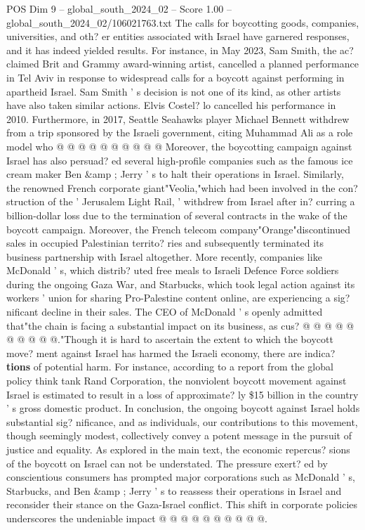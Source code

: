 \begin{textsample}{POS Dim 9 – global\_south\_2024\_02 – Score 1.00 – global\_south\_2024\_02/106021763.txt}
The calls for boycotting goods, companies, universities, and oth? er entities associated with Israel have garnered responses, and it has indeed yielded results.
For instance, in May 2023, Sam Smith, the ac? claimed Brit and Grammy award-winning artist, cancelled a planned performance in Tel Aviv in response to widespread calls for a boycott against performing in apartheid Israel.
Sam Smith ' s decision is not one of its kind, as other artists have also taken similar actions.
Elvis Costel? lo cancelled his performance in 2010.
Furthermore, in 2017, Seattle Seahawks player Michael Bennett withdrew from a trip sponsored by the Israeli government, citing Muhammad Ali as a role model who @ @ @ @ @ @ @ @ @ @ Moreover, the boycotting campaign against Israel has also persuad? ed several high-profile companies such as the famous ice cream maker Ben \&amp ; Jerry ' s to halt their operations in Israel.
Similarly, the renowned French corporate giant"Veolia,"which had been involved in the con? struction of the ' Jerusalem Light Rail, ' withdrew from Israel after in? curring a billion-dollar loss due to the termination of several contracts in the wake of the boycott campaign.
Moreover, the French telecom company"Orange"discontinued sales in occupied Palestinian territo? ries and subsequently terminated its business partnership with Israel altogether.
More recently, companies like McDonald ' s, which distrib? uted free meals to Israeli Defence Force soldiers during the ongoing Gaza War, and Starbucks, which took legal action against its workers ' union for sharing Pro-Palestine content online, are experiencing a sig? nificant decline in their sales.
The CEO of McDonald ' s openly admitted that"the chain is facing a substantial impact on its business, as cus? @ @ @ @ @ @ @ @ @ @."Though it is hard to ascertain the extent to which the boycott move? ment against Israel has harmed the Israeli economy, there are indica? \textbf{tions} of potential harm.
For instance, according to a report from the global policy think tank Rand Corporation, the nonviolent boycott movement against Israel is estimated to result in a loss of approximate? ly \$15 billion in the country ' s gross domestic product.
In conclusion, the ongoing boycott against Israel holds substantial sig? nificance, and as individuals, our contributions to this movement, though seemingly modest, collectively convey a potent message in the pursuit of justice and equality.
As explored in the main text, the economic repercus? sions of the boycott on Israel can not be understated.
The pressure exert? ed by conscientious consumers has prompted major corporations such as McDonald ' s, Starbucks, and Ben \&amp ; Jerry ' s to reassess their operations in Israel and reconsider their stance on the Gaza-Israel conflict.
This shift in corporate policies underscores the undeniable impact @ @ @ @ @ @ @ @ @ @.

\end{textsample}
